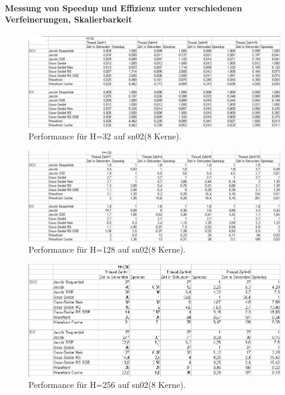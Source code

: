 \documentclass{article}
\begin{document}
\newpage

\paragraph{Messung von Speedup und Effizienz unter verschiedenen Verfeinerungen, Skalierbarkeit}
\begin{figure}[htbp] 
  \centering
     \includegraphics[width=1.0\textwidth]{bilder/sn0232.png}
  \caption{Performance für H=32 auf sn02(8 Kerne).}
 
\end{figure}
\begin{figure}[htbp] 
  \centering
     \includegraphics[width=1.0\textwidth]{bilder/sn02128.png}
  \caption{Performance für H=128 auf sn02(8 Kerne).}
 
\end{figure}
\begin{figure}[htbp] 
  \centering
     \includegraphics[width=1.0\textwidth]{bilder/sn02256.png}
  \caption{Performance für H=256 auf sn02(8 Kerne).}
 
\end{figure}
\end{document}
